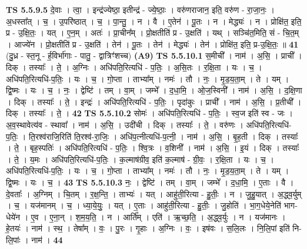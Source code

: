 \documentclass[17pt]{extarticle}
\begin{document}
                                \textbf{ TS 5.5.9.5} \newline
                  दे॒वाः । त्वा॒ । इन्द्र॑ज्येष्ठा॒ इतीन्द्र॑ - ज्ये॒ष्ठाः॒ । वरु॑णराजान॒ इति॒ वरु॑ण - रा॒जा॒नः॒ । अ॒धस्ता᳚त् । च॒ । उ॒परि॑ष्ठात् । च॒ । पा॒न्तु॒ । न । वै । ए॒तेन॑ । पू॒तः । न । मेद्ध्यः॑ । न । प्रोक्षि॑त॒ इति॒ प्र - उ॒क्षि॒तः॒ । यत् । ए॒न॒म् । अतः॑ । प्रा॒चीन᳚म् । प्रो॒क्षतीति॑ प्र - उ॒क्षति॑ । यथ् । सञ्चि॑त॒मिति॒ सं - चि॒त॒म् । आज्ये॑न । प्रो॒क्षतीति॑ प्र - उ॒क्षति॑ । तेन॑ । पू॒तः । तेन॑ । मेद्ध्यः॑ । तेन॑ । प्रोक्षि॑त॒ इति॒ प्र-उ॒क्षि॒तः॒ ॥ \textbf{  41} \newline
                  \newline
                      (दु॒ध्र - स्त॒नू - र्ह॒विर्भा॑गाः - पातु॒ - द्वात्रिꣳ॑शच्च)  \textbf{(A9)} \newline \newline
                                \textbf{ TS 5.5.10.1} \newline
                  स॒मीची᳚ । नाम॑ । अ॒सि॒ । प्राची᳚ । दिक् । तस्याः᳚ । ते॒ । अ॒ग्निः । अधि॑पति॒रित्यधि॑ - प॒तिः॒ । अ॒सि॒तः । र॒क्षि॒ता । यः । च॒ । अधि॑पति॒रित्यधि॑-प॒तिः॒ । यः । च॒ । गो॒प्ता । ताभ्या᳚म् । नमः॑ । तौ । नः॒ । मृ॒ड॒य॒ता॒म् । ते । यम् । द्वि॒ष्मः । यः । च॒ । नः॒ । द्वेष्टि॑ । तम् । वा॒म् । जम्भे᳚ । द॒धा॒मि॒ । ओ॒ज॒स्विनी᳚ । नाम॑ । अ॒सि॒ । द॒क्षि॒णा । दिक् । तस्याः᳚ । ते॒ । इन्द्रः॑ । अधि॑पति॒रित्यधि॑ - प॒तिः॒ । पृदा॑कुः । प्राची᳚ । नाम॑ । अ॒सि॒ । प्र॒तीची᳚ । दिक् । तस्याः᳚ । ते॒ । \textbf{  42} \newline
                  \newline
                                \textbf{ TS 5.5.10.2} \newline
                  सोमः॑ । अधि॑पति॒रित्यधि॑ - प॒तिः॒ । स्व॒ज इति॑ स्व - जः । अ॒व॒स्थावेत्य॑व - स्थावा᳚ । नाम॑ । अ॒सि॒ । उदी॑ची । दिक् । तस्याः᳚ । ते॒ । वरु॑णः । अधि॑पति॒रित्यधि॑-प॒तिः॒ । ति॒रश्व॑राजि॒रिति॑ ति॒रश्व॑-रा॒जिः॒ । अधि॑प॒त्नीत्यधि॑-प॒त्नी॒ । नाम॑ । अ॒सि॒ । बृ॒ह॒ती । दिक् । तस्याः᳚ । ते॒ । बृह॒स्पतिः॑ । अधि॑पति॒रित्यधि॑ - प॒तिः॒ । श्वि॒त्रः । व॒शिनी᳚ । नाम॑ । अ॒सि॒ । इ॒यं । दिक् । तस्याः᳚ । ते॒ । य॒मः । अधि॑पति॒रित्यधि॑-प॒तिः॒ । क॒ल्माष॑ग्रीव॒ इति॑ क॒ल्माष॑ - ग्री॒वः॒ । र॒क्षि॒ता । यः । च॒ । अधि॑पति॒रित्यधि॑-प॒तिः॒ । यः । च॒ । गो॒प्ता । ताभ्या᳚म् । नमः॑ । तौ । नः॒ । मृ॒ड॒य॒ता॒म् । ते । यम् । द्वि॒ष्मः । यः । च॒ । \textbf{  43} \newline
                  \newline
                                \textbf{ TS 5.5.10.3} \newline
                  नः॒ । द्वेष्टि॑ । तम् । वा॒म् । जम्भे᳚ । द॒धा॒मि॒ । ए॒ताः । वै । दे॒वताः᳚ । अ॒ग्निम् । चि॒तम् । र॒क्ष॒न्ति॒ । ताभ्यः॑ । यत् । आहु॑ती॒रित्या - हु॒तीः॒ । न । जु॒हु॒यात् । अ॒द्ध्व॒र्युम् । च॒ । यज॑मानम् । च॒ । ध्या॒ये॒युः॒ । यत् । ए॒ताः । आहु॑ती॒रित्या - हु॒तीः॒ । जु॒होति॑ । भा॒ग॒धेये॒नेति॑ भाग-धेये॑न । ए॒व । ए॒ना॒न् । श॒म॒य॒ति॒ । न । आर्ति᳚म् । एति॑ । ऋ॒च्छ॒ति॒ । अ॒द्ध्व॒र्युः । न । यज॑मानः । हे॒तयः॑ । नाम॑ । स्थ॒ । तेषा᳚म् । वः॒ । पु॒रः । गृ॒हाः । अ॒ग्निः । वः॒ । इष॑वः । स॒लि॒लः । नि॒लि॒पां इति॑ नि-लि॒पांः । नाम॑ । \textbf{  44} \newline
\end{document}
